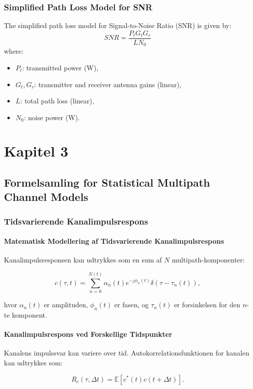 \documentclass[a4paper,12pt]{book}
\begin{document}
	\subsection{Simplified Path Loss Model for SNR}
	The simplified path loss model for Signal-to-Noise Ratio (SNR) is given by:
	\[
	SNR = \frac{P_t G_t G_r}{L N_0}
	\]
	where:
	\begin{itemize}
		\item \( P_t \): transmitted power (W),
		\item \( G_t, G_r \): transmitter and receiver antenna gains (linear),
		\item \( L \): total path loss (linear),
		\item \( N_0 \): noise power (W).
	\end{itemize} 
	
	\chapter{Kapitel 3}
	\section{Formelsamling for Statistical Multipath Channel Models}
	
	\subsection{Tidsvarierende Kanalimpulsrespons}
	
	\subsubsection{Matematisk Modellering af Tidsvarierende Kanalimpulsrespons}
	Kanalimpulsresponsen kan udtrykkes som en sum af \( N \) multipath-komponenter:
	
	\[
	c(\tau, t) = \sum_{n=0}^{N(t)} \alpha_n(t) e^{-j \phi_n(t)} \delta(\tau - \tau_n(t)),
	\]
	
	hvor \( \alpha_n(t) \) er amplituden, \( \phi_n(t) \) er fasen, og \( \tau_n(t) \) er forsinkelsen for den \(n\)-te komponent.
	
	\subsubsection{Kanalimpulsrespons ved Forskellige Tidspunkter}
	Kanalens impulssvar kan variere over tid. Autokorrelationsfunktionen for kanalen kan udtrykkes som:
	
	\[
	R_c(\tau, \Delta t) = \mathbb{E}[c^*(t) c(t + \Delta t)].
	\]
	
\end{document}
